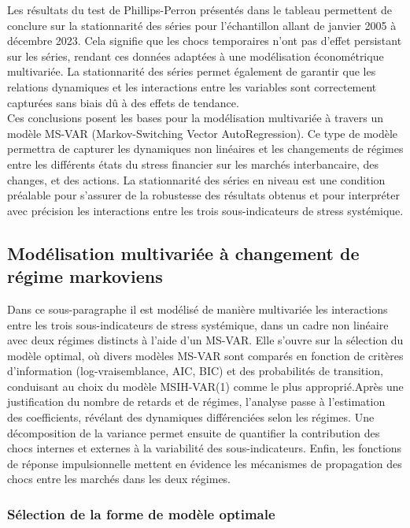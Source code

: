 Les résultats du test de Phillips-Perron présentés dans le tableau permettent de conclure sur la stationnarité des séries pour l'échantillon allant de janvier 2005 à décembre 2023. Cela signifie que les chocs temporaires n'ont pas d'effet persistant sur les séries, rendant ces données adaptées à une modélisation économétrique multivariée. La stationnarité des séries permet également de garantir que les relations dynamiques et les interactions entre les variables sont correctement capturées sans biais dû à des effets de tendance.\\

Ces conclusions posent les bases pour la modélisation multivariée à travers un modèle MS-VAR (Markov-Switching Vector AutoRegression). Ce type de modèle permettra de capturer les dynamiques non linéaires et les changements de régimes entre les différents états du stress financier sur les marchés interbancaire, des changes, et des actions. La stationnarité des séries en niveau est une condition préalable pour s'assurer de la robustesse des résultats obtenus et pour interpréter avec précision les interactions entre les trois sous-indicateurs de stress systémique.

\subsection{Modélisation multivariée à changement de régime markoviens}

Dans ce sous-paragraphe il est modélisé de manière multivariée les interactions entre les trois sous-indicateurs de stress systémique, dans un cadre non linéaire avec deux régimes distincts à l'aide d'un MS-VAR. Elle s’ouvre sur la sélection du modèle optimal, où divers modèles MS-VAR sont comparés en fonction de critères d’information (log-vraisemblance, AIC, BIC) et des probabilités de transition, conduisant au choix du modèle MSIH-VAR(1) comme le plus approprié.Après une justification du nombre de retards et de régimes, l’analyse passe à l’estimation des coefficients, révélant des dynamiques différenciées selon les régimes. Une décomposition de la variance permet ensuite de quantifier la contribution des chocs internes et externes à la variabilité des sous-indicateurs. Enfin, les fonctions de réponse impulsionnelle mettent en évidence les mécanismes de propagation des chocs entre les marchés dans les deux régimes.

\subsubsection{Sélection de la forme de modèle optimale}

